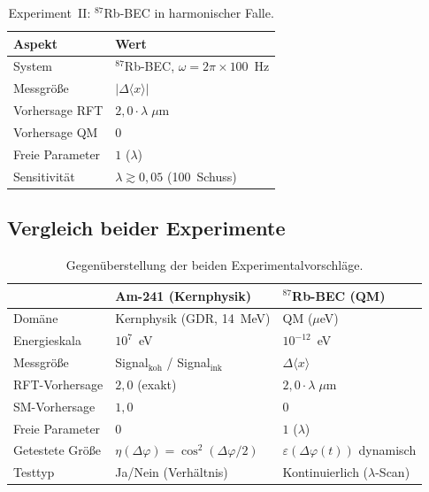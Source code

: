 \documentclass[12pt]{iopart}
\begin{document}
	\begin{table}[ht]
		\centering
		\caption{Experiment~II:
			${}^{87}$Rb-BEC in harmonischer Falle.}
		\label{tab:exp_rb87}
		\begin{tabular}{ll}
			\hline
			\textbf{Aspekt} & \textbf{Wert} \\
			\hline
			System & ${}^{87}$Rb-BEC,
			$\omega = 2\pi \times 100$~Hz \\
			Messgr\"o\ss{}e &
			$|\Delta\langle x\rangle|$ \\
			Vorhersage RFT &
			$2{,}0 \cdot \lambda\;\mu$m \\
			Vorhersage QM & $0$ \\
			Freie Parameter & $1$ ($\lambda$) \\
			Sensitivit\"at &
			$\lambda \gtrsim 0{,}05$ (100~Schuss) \\
			\hline
		\end{tabular}
	\end{table}
	
	\subsection{Vergleich beider Experimente}
	\label{sec:exp_vergleich}
	
	\begin{table}[ht]
		\centering
		\caption{Gegen\"uberstellung der beiden
			Experimentalvorschl\"age.}
		\label{tab:exp_comparison}
		\begin{tabular}{lll}
			\hline
			& \textbf{Am-241 (Kernphysik)}
			& \textbf{${}^{87}$Rb-BEC (QM)} \\
			\hline
			Dom\"ane & Kernphysik (GDR, 14~MeV)
			& QM ($\mu$eV) \\
			Energieskala & $10^7$~eV
			& $10^{-12}$~eV \\
			Messgr\"o\ss{}e
			& Signal$_{\mathrm{koh}}$ /
			Signal$_{\mathrm{ink}}$
			& $\Delta\langle x\rangle$ \\
			RFT-Vorhersage & $2{,}0$ (exakt)
			& $2{,}0 \cdot \lambda\;\mu$m \\
			SM-Vorhersage & $1{,}0$
			& $0$ \\
			Freie Parameter & $0$
			& $1$ ($\lambda$) \\
			Getestete Gr\"o\ss{}e
			& $\eta(\Delta\varphi) = \cos^2(\Delta\varphi/2)$
			& $\varepsilon(\Delta\varphi(t))$ dynamisch \\
			Testtyp & Ja/Nein (Verh\"altnis)
			& Kontinuierlich ($\lambda$-Scan) \\
			\hline
		\end{tabular}
	\end{table}
	
\end{document}
